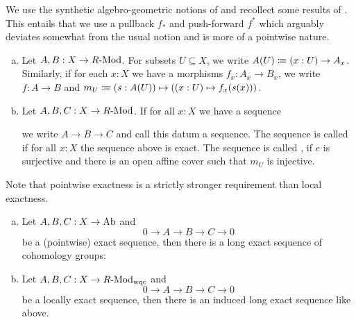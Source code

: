 
We use the synthetic algebro-geometric notions of \cite{draft}
and recollect some results of \cite{cech-draft}.
This entails that we use a pullback $f_\ast$ and push-forward $f^\ast$ which arguably deviates somewhat from the usual notion and is more of a pointwise nature.

\begin{definition}
  \begin{enumerate}[(a)]
  \item Let $A,B:X\to R\text{-}\mathrm{Mod}$.
    For subsets $U\subseteq X$, we write $A(U)\vcentcolon\mspace{-1.2mu}\equiv (x:U)\to A_x$.
    Similarly, if for each $x:X$ we have a morphisms $f_x:A_x\to B_x$,
    we write $f:A\to B$ and $m_U\vcentcolon\mspace{-1.2mu}\equiv (s:A(U))\mapsto ((x:U)\mapsto f_x(s(x)))$.
  \item Let $A,B,C:X\to R\text{-}\mathrm{Mod}$.
    If for all $x:X$ we have a sequence
    \begin{center}
    \end{center}
    we write $A\to B\to C$ and call this datum a sequence.
    The sequence is called 
    if for all $x:X$ the sequence above is exact.
    The sequence is called ,
    if $e$ is surjective and there is an open affine cover such that $m_U$ is injective.
  \end{enumerate}
\end{definition}

Note that pointwise exactness is a strictly stronger requirement than local exactness.

\begin{theorem}
  \begin{enumerate}[(a)]
  \item Let $A,B,C:X\to \operatorname{Ab}$ and 
    \[
    0\to A\to B\to C\to 0
    \]
    be a (pointwise) exact sequence, then there is a long exact sequence of cohomology groups:
    \begin{center}
    \end{center}
  \item Let $A,B,C:X\to R\text{-}\mathrm{Mod}_{\mathrm{wqc}}$ and
    \[
    0\to A\to B\to C\to 0
    \]
    be a locally exact sequence,
    then there is an induced long exact sequence like above.
  \end{enumerate}
\end{theorem}

